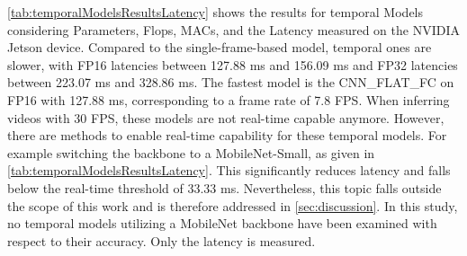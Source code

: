 \autoref{tab:temporalModelsResultsLatency} shows the results for temporal Models considering Parameters, Flops, MACs, and the Latency measured on the NVIDIA Jetson device.
Compared to the single-frame-based model, temporal ones are slower, with FP16 latencies between 127.88 ms and 156.09 ms and FP32 latencies between 223.07 ms and 328.86 ms.
The fastest model is the CNN\_FLAT\_FC on FP16 with 127.88 ms, corresponding to a frame rate of 7.8 \ac{FPS}.
When inferring videos with 30 \ac{FPS}, these models are not real-time capable anymore.
However, there are methods to enable real-time capability for these temporal models.
For example switching the backbone to a MobileNet-Small, as given in \autoref{tab:temporalModelsResultsLatency}.
This significantly reduces latency and falls below the real-time threshold of 33.33 ms.
Nevertheless, this topic falls outside the scope of this work and is therefore addressed in \autoref{sec:discussion}.
In this study, no temporal models utilizing a MobileNet backbone have been examined with respect to their accuracy.
Only the latency is measured.
